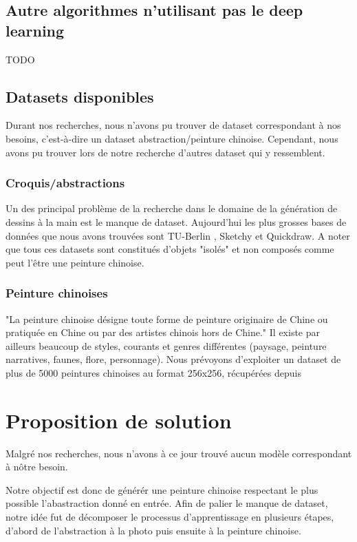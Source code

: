\documentclass[a4paper, 12pt]{report}
\begin{document}
\section{Autre algorithmes n'utilisant pas le deep learning}
TODO


\section{Datasets disponibles}
Durant nos recherches, nous n'avons pu trouver de dataset correspondant à nos besoins, c'est-à-dire un dataset abstraction/peinture chinoise. Cependant, nous avons pu trouver lors de notre recherche d'autres dataset qui y ressemblent.

\subsection{Croquis/abstractions}
Un des principal problème de la recherche dans le domaine de la génération de dessins à la main est le manque de dataset. Aujourd'hui les plus grosses bases de données que nous avons trouvées sont TU-Berlin \cite{eitz2012hdhso}, Sketchy \cite{sketchy2016} et Quickdraw. A noter que tous ces datasets sont constitués d'objets "isolés" et non composés comme peut l'être une peinture chinoise.

\subsection{Peinture chinoises}
"La peinture chinoise désigne toute forme de peinture originaire de Chine ou pratiquée en Chine ou par des artistes chinois hors de Chine." \cite{wiki:Peinture-chinoise} Il existe par ailleurs beaucoup de styles, courants et genres différentes (paysage, peinture narratives, faunes, flore, personnage). Nous prévoyons d'exploiter un dataset de plus de 5000 peintures chinoises au format 256x256, récupérées depuis \cite{ychen93}


\chapter{Proposition de solution}
Malgré nos recherches, nous n'avons à ce jour trouvé aucun modèle correspondant à nôtre besoin. 

Notre objectif est donc de générér une peinture chinoise respectant le plus possible l'abastraction donné en entrée.%
Afin de palier le manque de dataset, notre idée fut de décomposer le processus d'apprentissage en plusieurs étapes, d'abord de l'abstraction à la photo puis ensuite à la peinture chinoise. %
\end{document}
